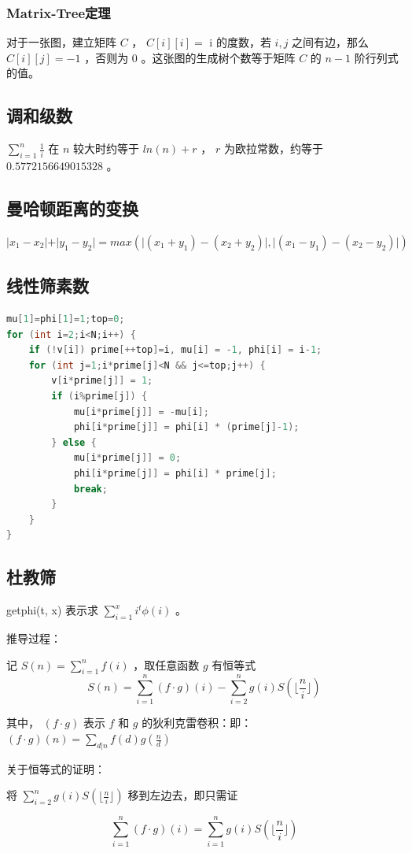\documentclass{article}
\begin{document}
\subsubsection{Matrix-Tree定理}
对于一张图，建立矩阵 $C$ ， $C[i][i] = $ i 的度数，若 $i, j$ 之间有边，那么 $C[i][j] = -1$ ，否则为 $0$ 。这张图的生成树个数等于矩阵 $C$ 的 $n-1$ 阶行列式的值。
\subsection{调和级数}
$\sum\limits_{i=1}^n \frac{1}{i}$ 在 $n$ 较大时约等于 $ln(n) + r$ ， $r$ 为欧拉常数，约等于 $0.5772156649015328$ 。
\subsection{曼哈顿距离的变换}
$\vert x_1 - x_2 \vert + \vert y_1 - y_2 \vert = max(\vert(x_1 + y_1) - (x_2 + y_2) \vert, \vert(x_1 - y_1) - (x_2 - y_2) \vert)$
\subsection{线性筛素数}
\begin{lstlisting}[language=C++]
mu[1]=phi[1]=1;top=0;
for (int i=2;i<N;i++) {
	if (!v[i]) prime[++top]=i, mu[i] = -1, phi[i] = i-1;
	for (int j=1;i*prime[j]<N && j<=top;j++) {
		v[i*prime[j]] = 1;
		if (i%prime[j]) {
			mu[i*prime[j]] = -mu[i];
			phi[i*prime[j]] = phi[i] * (prime[j]-1);
		} else {
			mu[i*prime[j]] = 0;
			phi[i*prime[j]] = phi[i] * prime[j];
			break;
		}
	}
}
\end{lstlisting}
\subsection{杜教筛}
getphi(t, x) 表示求 $\sum\limits_{i = 1}^{x} i^t \phi(i)$ 。

推导过程：

记 $S(n) = \sum\limits_{i = 1}^{n} f(i)$ ，取任意函数 $g$ 有恒等式
$$S(n) = \sum\limits_{i = 1}^{n} (f \cdot g) (i) - \sum\limits_{i = 2}^{n} g(i) S(\lfloor \frac{n}{i} \rfloor)$$

其中， $(f \cdot g)$ 表示 $f$ 和 $g$ 的狄利克雷卷积：即： $(f \cdot g) (n) = \sum\limits_{d | n} f(d)g(\frac{n}{d})$

关于恒等式的证明：

将 $\sum\limits_{i = 2}^{n} g(i)S(\lfloor \frac{n}{i} \rfloor)$ 移到左边去，即只需证

$$\sum\limits_{i = 1}^{n} (f \cdot g) (i) = \sum\limits_{i = 1}^{n} g(i) S(\lfloor \frac{n}{i} \rfloor)$$
\end{document}
